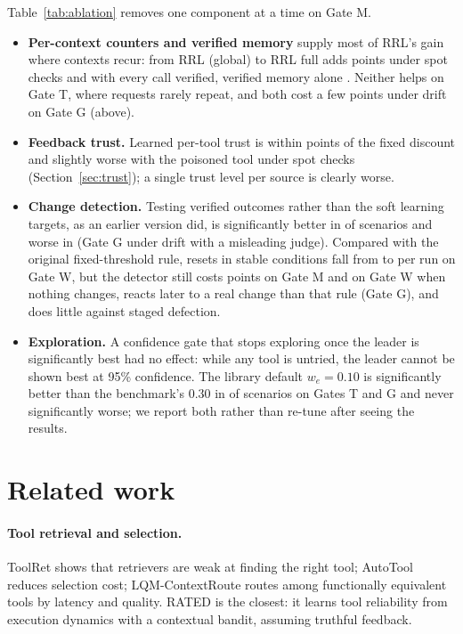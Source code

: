 \documentclass[11pt]{article}
\begin{document}


Table~\ref{tab:ablation} removes one component at a time on Gate M.
\begin{itemize}
  \item \textbf{Per-context counters and verified memory} supply most of RRL's gain where
  contexts recur: from RRL (global) to RRL full adds \MspotCtxGain{} points under spot checks and
  \MverCtxGain{} with every call verified, verified memory alone \MverVerifiedGain{}. Neither
  helps on Gate T, where requests rarely repeat, and both cost a few points under drift on Gate
  G (above).
  \item \textbf{Feedback trust.} Learned per-tool trust is within \TrustMaxAbs{} points of the
  fixed discount and slightly worse with the poisoned tool under spot checks
  (Section~\ref{sec:trust}); a single trust level per source is clearly worse.
  \item \textbf{Change detection.} Testing verified outcomes rather than the soft learning
  targets, as an earlier version did, is significantly better in \CdVerBetter{} of \CdN{} scenarios
  and worse in \CdSoftBetter{} (Gate G under drift with a misleading judge). Compared with the
  original fixed-threshold rule, resets in stable conditions fall from \WresetsOld{} to
  \WresetsNew{} per run on Gate W, but the detector still costs \McdCost{} points on Gate M and
  \WcdCost{} on Gate W when nothing changes, reacts later to a real change than that rule (Gate G),
  and does little against staged defection.
  \item \textbf{Exploration.} A confidence gate that stops exploring once the leader is
  significantly best had no effect: while any tool is untried, the leader cannot be shown best
  at 95\% confidence. The library default $w_e=0.10$ is significantly better than the
  benchmark's $0.30$ in \ETenBetter{} of \ETenN{} scenarios on Gates T and G and never significantly
  worse; we report both rather than re-tune after seeing the results.
\end{itemize}

\section{Related work}

\paragraph{Tool retrieval and selection.} ToolRet \citep{toolret} shows that retrievers are weak
at finding the right tool; AutoTool \citep{autotool} reduces selection cost; LQM-ContextRoute
\citep{lqm} routes among functionally equivalent tools by latency and quality. RATED
\citep{rated} is the closest: it learns tool reliability from execution dynamics with a
contextual bandit, assuming truthful feedback.
\end{document}
